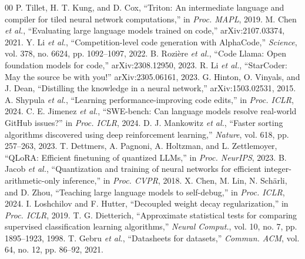 \documentclass[conference]{IEEEtran}
\begin{document}
\begin{thebibliography}{00}
 P. Tillet, H. T. Kung, and D. Cox, ``Triton: An intermediate language and compiler for tiled neural network
computations,'' in \emph{Proc. MAPL}, 2019.
 M. Chen \emph{et al.}, ``Evaluating large language models trained on code,'' arXiv:2107.03374, 2021.
 Y. Li \emph{et al.}, ``Competition-level code generation with AlphaCode,'' \emph{Science}, vol. 378, no. 6624, pp. 1092--1097, 2022.
 B. Rozi\`ere \emph{et al.}, ``Code Llama: Open foundation models for code,'' arXiv:2308.12950, 2023.
 R. Li \emph{et al.}, ``StarCoder: May the source be with you!'' arXiv:2305.06161, 2023.
 G. Hinton, O. Vinyals, and J. Dean, ``Distilling the knowledge in a neural network,'' arXiv:1503.02531, 2015.
 A. Shypula \emph{et al.}, ``Learning performance-improving code edits,'' in \emph{Proc. ICLR}, 2024.
 C. E. Jimenez \emph{et al.}, ``SWE-bench: Can language models resolve real-world GitHub issues?'' in \emph{Proc. ICLR}, 2024.
 D. J. Mankowitz \emph{et al.}, ``Faster sorting algorithms discovered using deep reinforcement learning,''
\emph{Nature}, vol. 618, pp. 257--263, 2023.
 T. Dettmers, A. Pagnoni, A. Holtzman, and L. Zettlemoyer, ``QLoRA: Efficient finetuning of quantized LLMs,'' in \emph{Proc. NeurIPS}, 2023.
 B. Jacob \emph{et al.}, ``Quantization and training of neural networks for efficient integer-arithmetic-only
inference,'' in \emph{Proc. CVPR}, 2018.
 X. Chen, M. Lin, N. Sch\"arli, and D. Zhou, ``Teaching large language models to self-debug,'' in \emph{Proc. ICLR}, 2024.
 I. Loshchilov and F. Hutter, ``Decoupled weight decay regularization,'' in \emph{Proc. ICLR}, 2019.
 T. G. Dietterich, ``Approximate statistical tests for comparing supervised classification learning
algorithms,'' \emph{Neural Comput.}, vol. 10, no. 7, pp. 1895--1923, 1998.
 T. Gebru \emph{et al.}, ``Datasheets for datasets,'' \emph{Commun. ACM}, vol. 64, no. 12, pp. 86--92, 2021.
\end{thebibliography}
\end{document}
